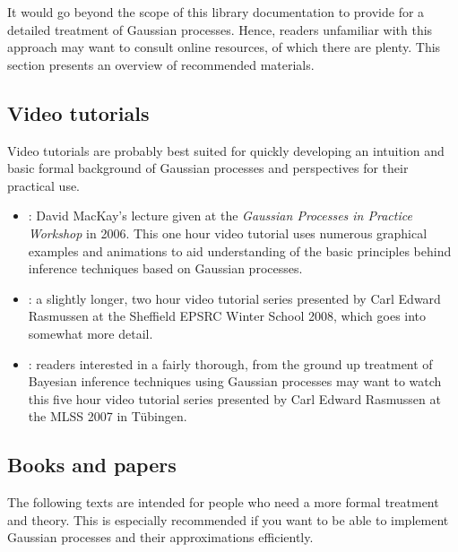 \documentclass[10pt]{report}
\begin{document}
It would go beyond the scope of this library documentation to provide
for a detailed treatment of Gaussian processes.  Hence, readers
unfamiliar with this approach may want to consult online resources,
of which there are plenty.  This section presents an overview
of recommended materials.

\subsection{Video tutorials}

Video tutorials are probably best suited for quickly developing an
intuition and basic formal background of Gaussian processes and
perspectives for their practical use.

\begin{itemize}

\item
\emph{}: David MacKay's lecture given at the \emph{Gaussian
Processes in Practice Workshop} in 2006.  This one hour video
tutorial uses numerous graphical examples and animations to aid
understanding of the basic principles behind inference techniques
based on Gaussian processes.

\item
\emph{}: a slightly longer, two hour video tutorial
series presented by Carl Edward Rasmussen at the Sheffield EPSRC
Winter School 2008, which goes into somewhat more detail.

\item
\emph{}: readers interested in a fairly
thorough, from the ground up treatment of Bayesian inference
techniques using Gaussian processes may want to watch this five
hour video tutorial series presented by Carl Edward Rasmussen at
the MLSS 2007 in T\"ubingen.

\end{itemize}

\subsection{Books and papers}

The following texts are intended for people who need a more formal
treatment and theory.  This is especially recommended if you want
to be able to implement Gaussian processes and their approximations
efficiently.
\end{document}
